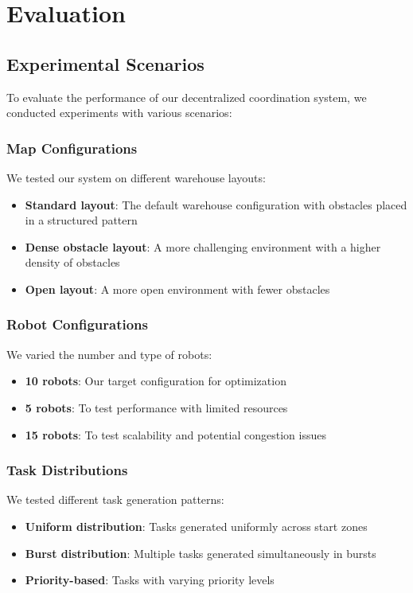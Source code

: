 \documentclass[12pt,a4paper]{article}
\begin{document}
\section{Evaluation}

\subsection{Experimental Scenarios}
To evaluate the performance of our decentralized coordination system, we conducted experiments with various scenarios:

\subsubsection{Map Configurations}
We tested our system on different warehouse layouts:
\begin{itemize}
    \item \textbf{Standard layout}: The default warehouse configuration with obstacles placed in a structured pattern
    \item \textbf{Dense obstacle layout}: A more challenging environment with a higher density of obstacles
    \item \textbf{Open layout}: A more open environment with fewer obstacles
\end{itemize}

\subsubsection{Robot Configurations}
We varied the number and type of robots:
\begin{itemize}
    \item \textbf{10 robots}: Our target configuration for optimization
    \item \textbf{5 robots}: To test performance with limited resources
    \item \textbf{15 robots}: To test scalability and potential congestion issues
\end{itemize}

\subsubsection{Task Distributions}
We tested different task generation patterns:
\begin{itemize}
    \item \textbf{Uniform distribution}: Tasks generated uniformly across start zones
    \item \textbf{Burst distribution}: Multiple tasks generated simultaneously in bursts
    \item \textbf{Priority-based}: Tasks with varying priority levels
\end{itemize}
\end{document}
